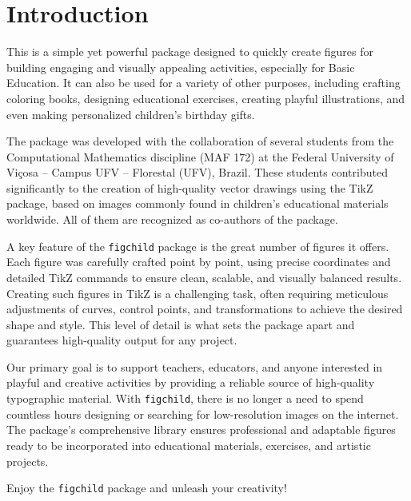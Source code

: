 \documentclass[x11names]{article}
\begin{document}
	\tableofcontents
	
	\listoftables
	
	\strut\newpage
	
	\section{Introduction}
	
	\hspace{\parindent}This is a simple yet powerful package designed to quickly create figures for building engaging and visually appealing activities, especially for Basic Education. It can also be used for a variety of other purposes, including crafting coloring books, designing educational exercises, creating playful illustrations, and even making personalized children’s birthday gifts.
	
	The package was developed with the collaboration of several students from the Computational Mathematics discipline (MAF 172) at the Federal University of Viçosa – Campus UFV – Florestal (UFV), Brazil. These students contributed significantly to the creation of high-quality vector drawings using the TikZ package, based on images commonly found in children’s educational materials worldwide. All of them are recognized as co-authors of the package.
	
	A key feature of the \texttt{figchild} package is the great number of figures it offers. Each figure was carefully crafted point by point, using precise coordinates and detailed TikZ commands to ensure clean, scalable, and visually balanced results. Creating such figures in TikZ is a challenging task, often requiring meticulous adjustments of curves, control points, and transformations to achieve the desired shape and style. This level of detail is what sets the package apart and guarantees high-quality output for any project.
	
	Our primary goal is to support teachers, educators, and anyone interested in playful and creative activities by providing a reliable source of high-quality typographic material. With \texttt{figchild}, there is no longer a need to spend countless hours designing or searching for low-resolution images on the internet. The package’s comprehensive library ensures professional and adaptable figures ready to be incorporated into educational materials, exercises, and artistic projects.
	
	Enjoy the \texttt{figchild} package and unleash your creativity!
	
	
	
\end{document}
